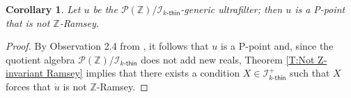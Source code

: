 \documentclass{amsart}
\newtheorem{theorem}{Theorem}[section]
\newtheorem{lemma}[theorem]{Lemma}
\newtheorem{corollary}[theorem]{Corollary}
\theoremstyle{definition}
\theoremstyle{remark}
\numberwithin{equation}{section}
\newcommand{\kthin}{k\text{-}\mathsf{thin}}
\newcommand{\restr}[2]{#1\upharpoonright {#2}}
\begin{document}




\begin{corollary}\label{T:P-PointNoZ-Rasey}
Let $u$ be the 
$\mathcal{P}(\mathbb{Z})/\mathcal{I}_{\kthin}$-generic ultrafilter; then $u$ is a P-point that is not $\mathbb{Z}$-Ramsey.
\end{corollary}

\begin{proof}
    By Observation 2.4 from \cite{MR2861027}, it follows that $u$ is a P-point and, since the quotient algebra $\mathcal{P}(\mathbb{Z})/\mathcal{I}_{\kthin}$ does not add new reals, Theorem \ref{T:Not Z-invariant Ramsey} implies that there exists a condition $X \in \mathcal{I}^{+}_{\kthin}$ such that $X$ forces that $\dot{u}$ is not $\mathbb{Z}$-Ramsey. 
\end{proof}


\end{document}
